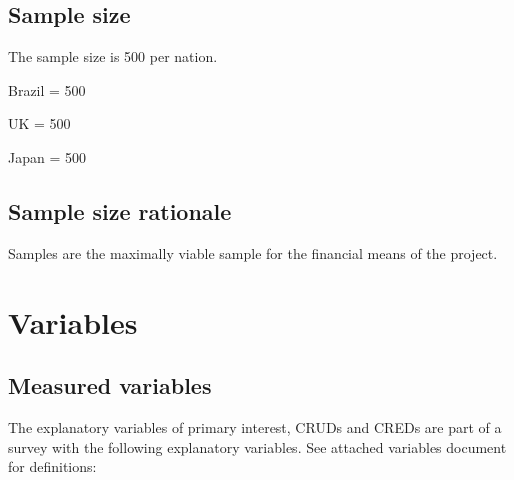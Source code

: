 \documentclass[]{article}
\begin{document}
\hypertarget{sample-size}{%
\subsection{Sample size}\label{sample-size}}

The sample size is 500 per nation.

Brazil = 500

UK = 500

Japan = 500

\hypertarget{sample-size-rationale}{%
\subsection{Sample size rationale}\label{sample-size-rationale}}

Samples are the maximally viable sample for the financial means of the
project.

\hypertarget{variables}{%
\section{Variables}\label{variables}}

\hypertarget{measured-variables}{%
\subsection{Measured variables}\label{measured-variables}}

The explanatory variables of primary interest, CRUDs and CREDs are part
of a survey with the following explanatory variables. See attached
variables document for definitions:
\end{document}
